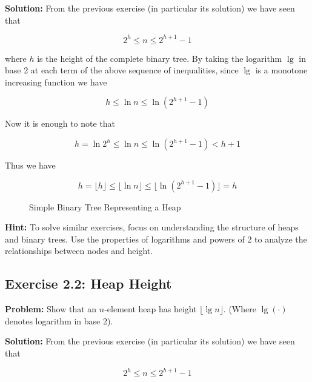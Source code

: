 \vspace{0.5em}
\textbf{Solution:} From the previous exercise (in particular its solution) we have seen that

\[ 2^h \leq n \leq 2^{h+1} - 1 \]

where $h$ is the height of the complete binary tree. By taking the logarithm $\lg$ in base 2 at each term of the above sequence of inequalities, since $\lg$ is a monotone increasing function we have

\[ h \leq \ln n \leq \ln(2^{h+1} - 1) \]

Now it is enough to note that

\[ h = \ln 2^h \leq \ln n \leq \ln(2^{h+1} - 1) < h + 1 \]

Thus we have

\[ h = \lfloor h \rfloor \leq \lfloor \ln n \rfloor \leq \lfloor \ln(2^{h+1} - 1) \rfloor = h \]

\begin{figure}[H]
    \centering
    \caption*{\footnotesize Simple Binary Tree Representing a Heap}
\end{figure}

\textbf{Hint:} To solve similar exercises, focus on understanding the structure of heaps and binary trees. Use the properties of logarithms and powers of 2 to analyze the relationships between nodes and height.

\subsection{Exercise 2.2: Heap Height}
\textbf{Problem:} Show that an $n$-element heap has height $\lfloor \lg n \rfloor$. (Where $\lg(\cdot)$ denotes logarithm in base 2).

\vspace{0.5em}
\textbf{Solution:} From the previous exercise (in particular its solution) we have seen that

\[ 2^h \leq n \leq 2^{h+1} - 1 \]


